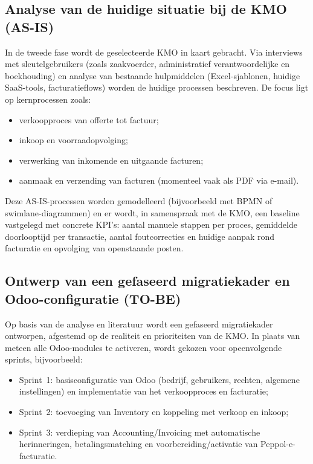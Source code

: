 \subsection{Analyse van de huidige situatie bij de KMO (AS-IS)}

In de tweede fase wordt de geselecteerde KMO in kaart gebracht. Via interviews met sleutelgebruikers (zoals zaakvoerder, administratief verantwoordelijke en boekhouding) en analyse van bestaande hulpmiddelen (Excel-sjablonen, huidige SaaS-tools, facturatieflows) worden de huidige processen beschreven. De focus ligt op kernprocessen zoals:
\begin{itemize}
  \item verkoopproces van offerte tot factuur;
  \item inkoop en voorraadopvolging;
  \item verwerking van inkomende en uitgaande facturen;
  \item aanmaak en verzending van facturen (momenteel vaak als PDF via e-mail).
\end{itemize}

Deze AS-IS-processen worden gemodelleerd (bijvoorbeeld met BPMN of swimlane-diagrammen) en er wordt, in samenspraak met de KMO, een baseline vastgelegd met concrete KPI’s: aantal manuele stappen per proces, gemiddelde doorlooptijd per transactie, aantal foutcorrecties en huidige aanpak rond facturatie en opvolging van openstaande posten.

\subsection{Ontwerp van een gefaseerd migratiekader en Odoo-configuratie (TO-BE)}

Op basis van de analyse en literatuur wordt een gefaseerd migratiekader ontworpen, afgestemd op de realiteit en prioriteiten van de KMO. In plaats van meteen alle Odoo-modules te activeren, wordt gekozen voor opeenvolgende sprints, bijvoorbeeld:
\begin{itemize}
  \item Sprint~1: basisconfiguratie van Odoo (bedrijf, gebruikers, rechten, algemene instellingen) en implementatie van het verkoopproces en facturatie;
  \item Sprint~2: toevoeging van Inventory en koppeling met verkoop en inkoop;
  \item Sprint~3: verdieping van Accounting/Invoicing met automatische herinneringen, betalingsmatching en voorbereiding/activatie van Peppol-e-facturatie.
\end{itemize}


